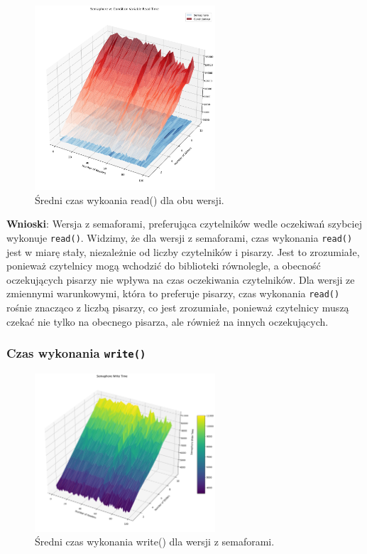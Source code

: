 \documentclass[11pt]{article}
\begin{document}
\begin{figure}[H]
\centering
\includegraphics[width=0.6\textwidth]{./semCondR.png}
\caption{Średni czas wykoania read() dla obu wersji.}
\end{figure}


\textbf{Wnioski}: Wersja z semaforami, preferująca czytelników wedle oczekiwań
szybciej wykonuje \texttt{read()}.
 Widzimy, że dla wersji z semaforami, czas
wykonania \texttt{read()} jest w miarę stały, niezależnie od liczby czytelników i pisarzy.
Jest to zrozumiałe, ponieważ czytelnicy mogą wchodzić do biblioteki równolegle,
a obecność oczekujących pisarzy nie wpływa na czas oczekiwania czytelników.
Dla wersji ze zmiennymi warunkowymi, która to preferuje pisarzy, czas wykonania
\texttt{read()} rośnie znacząco z liczbą pisarzy, co jest zrozumiałe, ponieważ czytelnicy
muszą czekać nie tylko na obecnego pisarza, ale również na innych oczekujących.
\subsubsection*{Czas wykonania \texttt{write()}}
\label{sec:org209c3fd}
\begin{figure}[H]
\centering
\includegraphics[width=0.6\textwidth]{./semW.png}
\caption{Średni czas wykonania write() dla wersji z semaforami.}
\end{figure}
\end{document}
